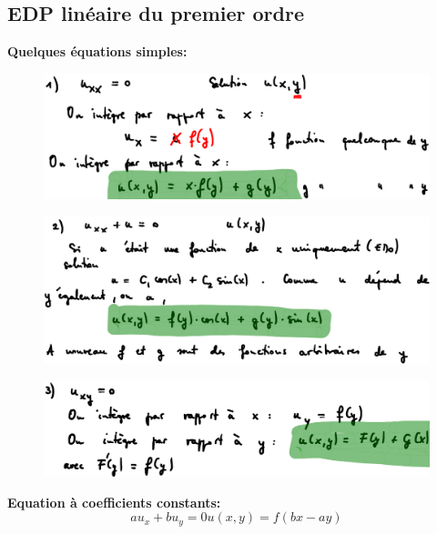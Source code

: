 \subsection*{EDP linéaire du premier ordre}
\textbf{Quelques équations simples:}
\begin{figure}[H]
    \centering
    \includegraphics[width=\linewidth]{images/semain1_equ_simple1.png}
\end{figure}
\begin{figure}[H]
    \centering
    \includegraphics[width=\linewidth]{images/semain1_equ_simple2.png}
\end{figure}
\begin{figure}[H]
    \centering
    \includegraphics[width=\linewidth]{images/semain1_equ_simple3.png}
\end{figure}
\textbf{Equation à coefficients constants:}
\begin{subequations}
    \begin{equation*}
        au_x+bu_y=0
    \end{equation*}
    \begin{equation*}
        \boxed{u(x,y)=f(bx-ay)}
    \end{equation*}
\end{subequations}
